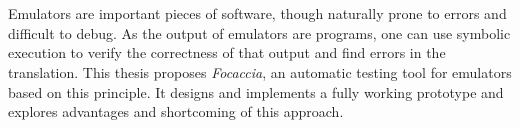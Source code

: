 \chapter{\abstractname}

Emulators are important pieces of software, though naturally prone to errors and difficult to debug. As the output of
emulators are programs, one can use symbolic execution to verify the correctness of that output and find errors in the
translation. This thesis proposes \textit{Focaccia}, an automatic testing tool for emulators based on this principle. It
designs and implements a fully working prototype and explores advantages and shortcoming of this approach.
